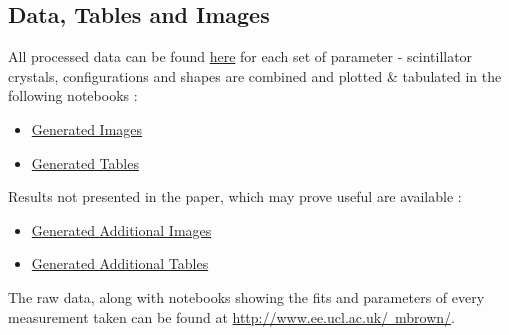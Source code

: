 \subsection{Data, Tables and Images}
All processed data can be found \href{https://github.com/marksbrown/doipaper/tree/master/processeddata}{here} for each set of parameter - scintillator crystals, configurations and shapes are combined and plotted \& tabulated in the following notebooks :
\begin{itemize}
\item \href{http://nbviewer.ipython.org/github/marksbrown/doipaper/blob/master/notebooks/Generate\%20Images.ipynb}{Generated Images}
\item \href{http://nbviewer.ipython.org/github/marksbrown/doipaper/blob/master/notebooks/Generate\%20Tables.ipynb}{Generated Tables}
\end{itemize}
Results not presented in the paper, which may prove useful are available :
\begin{itemize}
\item \href{http://nbviewer.ipython.org/github/marksbrown/doipaper/blob/master/notebooks/Generate\%20Additional\%20Images.ipynb}{Generated Additional Images}
\item \href{http://nbviewer.ipython.org/github/marksbrown/doipaper/blob/master/notebooks/Generate\%20Additional\%20Tables.ipynb}{Generated Additional Tables}
\end{itemize}

The raw data, along with notebooks showing the fits and parameters of every measurement taken can be found at \href{http://www.ee.ucl.ac.uk/~mbrown/}{http://www.ee.ucl.ac.uk/~mbrown/}.
